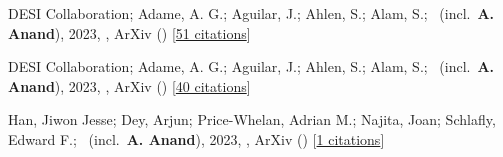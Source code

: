 \item[{\color{numcolor}\scriptsize3}] DESI Collaboration; Adame, A. G.; Aguilar, J.; Ahlen, S.; Alam, S.; \etal\ (incl.\ \textbf{A. Anand}), 2023, , ArXiv () [\href{https://ui.adsabs.harvard.edu/abs/2023arXiv230606308D}{51 citations}]

\item[{\color{numcolor}\scriptsize2}] DESI Collaboration; Adame, A. G.; Aguilar, J.; Ahlen, S.; Alam, S.; \etal\ (incl.\ \textbf{A. Anand}), 2023, , ArXiv () [\href{https://ui.adsabs.harvard.edu/abs/2023arXiv230606307D}{40 citations}]

\item[{\color{numcolor}\scriptsize1}] Han, Jiwon Jesse; Dey, Arjun; Price-Whelan, Adrian M.; Najita, Joan; Schlafly, Edward F.; \etal\ (incl.\ \textbf{A. Anand}), 2023, , ArXiv () [\href{https://ui.adsabs.harvard.edu/abs/2023arXiv230611784H}{1 citations}]
